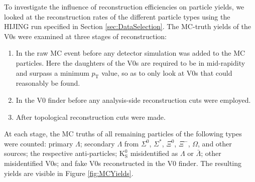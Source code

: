 To investigate the influence of reconstruction efficiencies on particle yields, we looked at the reconstruction rates of the different particle types using the HIJING run specified in Section \ref{sec:DataSelection}.  
The MC-truth yields of the V0s were examined at three stages of reconstruction:
\begin{enumerate}
\item In the raw MC event before any detector simulation was added to the MC particles.  
Here the daughters of the V0s are required to be in mid-rapidity and surpass a minimum $p_\mathrm{T}$ value, so as to only look at V0s that could reasonably be found.
\item In the V0 finder before any analysis-side reconstruction cuts were employed.
\item After topological reconstruction cuts were made.
\end{enumerate}
At each stage, the MC truths of all remaining particles of the following types were counted: primary $\Lambda$; secondary $\Lambda$ from $\Sigma^0$, $\Sigma^*$, $\Xi^0$, $\Xi^-$, $\Omega$, and other sources; the respective anti-particles; $\mathrm{K}^0_{\mathrm{S}}$ misidentified as $\Lambda$ or $\bar{\Lambda}$; other misidentified V0s; and fake V0s reconstructed in the V0 finder.  
The resulting yields are visible in Figure \ref{fig:MCYields}.

